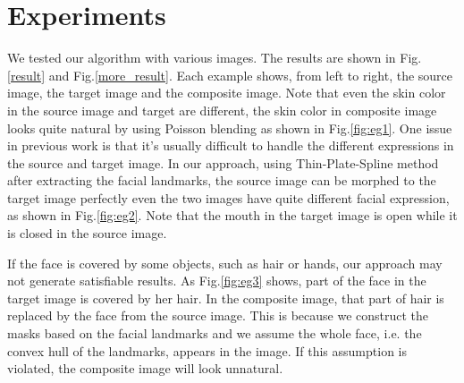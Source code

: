 \documentclass[10pt,twocolumn,letterpaper]{article}
\begin{document}
\section{Experiments}
\label{sec:experiment}
We tested our algorithm with various images. The results are shown in Fig.\ref{result} and Fig.\ref{more_result}. Each example shows, from left to right, the source image, the target image and the composite image. Note that even the skin color in the source image and target are different, the skin color in composite image looks quite natural by using Poisson blending as shown in Fig.\ref{fig:eg1}. One issue in previous work is that it's usually difficult to handle the different expressions in the source and target image. In our approach, using Thin-Plate-Spline method after extracting the facial landmarks, the source image can be morphed to the target image perfectly even the two images have quite different facial expression, as shown in Fig.\ref{fig:eg2}. Note that the mouth in the target image is open while it is closed in the source image.

If the face is covered by some objects, such as hair or hands, our approach may not generate satisfiable results. As Fig.\ref{fig:eg3} shows, part of the face in the target image is covered by her hair. In the composite image, that part of hair is replaced by the face from the source image. This is because we construct the masks based on the facial landmarks and we assume the whole face, i.e. the convex hull of the landmarks, appears in the image. If this assumption is violated, the composite image will look unnatural.
\end{document}
